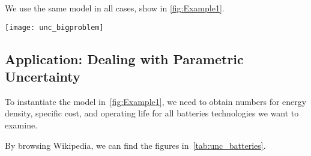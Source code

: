 We use the same model in all cases, show in \cref{fig:Example1}.
\begin{figure*}[b!]
    \centering
    \texttt{[image: unc\_bigproblem]}
    \caption{
        The semantics of the drone design exercises is the minimization of the  and  of the platform, subject to functionality constraints (, , ).
        We discuss how to introduce uncertainty in this framework, which allows, for example, to introduce parametric uncertainty in the definition of components properties (\eg, specific cost of batteries).
    }
    \label{fig:Example1}
\end{figure*}
\vfill\pagebreak

\subsection{Application: Dealing with Parametric Uncertainty\label{sec:Application-uncertainty}}

To instantiate the model in~\cref{fig:Example1}, we need to obtain numbers for energy density, specific cost, and operating life for all batteries technologies we want to examine.

By browsing Wikipedia, we can find the figures in~\cref{tab:unc_batteries}.

